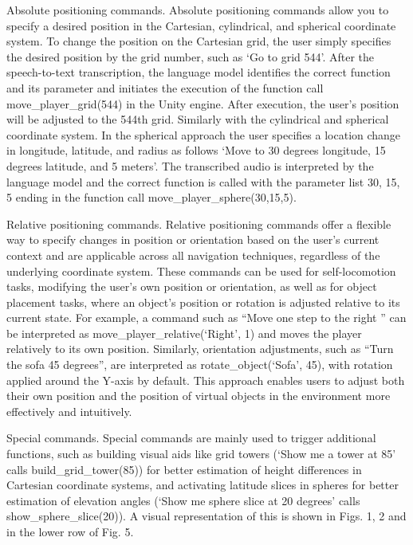 \documentclass[preprint,12pt]{elsarticle}
\newcommand{\reftext}[1]{{\color{gray}#1}}   %
\begin{document}
\reftext{Absolute positioning commands. Absolute positioning commands allow you to specify a desired position in the Cartesian, cylindrical, and spherical coordinate system. To change the position on the Cartesian grid, the user simply specifies the desired position by the grid number, such as `Go to grid 544'. After the speech-to-text transcription, the language model identifies the correct function and its parameter and initiates the execution of the function call move\_player\_grid(544) in the Unity engine. After execution, the user's position will be adjusted to the 544th grid. Similarly with the cylindrical and spherical coordinate system. In the spherical approach the user specifies a location change in longitude, latitude, and radius as follows `Move to 30 degrees longitude, 15 degrees latitude, and 5 meters'. The transcribed audio is interpreted by the language model and the correct function is called with the parameter list 30, 15, 5 ending in the function call move\_player\_sphere(30,15,5).}

\reftext{Relative positioning commands. Relative positioning commands offer a flexible way to specify changes in position or orientation based on the user's current context and are applicable across all navigation techniques, regardless of the underlying coordinate system. These commands can be used for self-locomotion tasks, modifying the user's own position or orientation, as well as for object placement tasks, where an object's position or rotation is adjusted relative to its current state. For example, a command such as ``Move one step to the right '' can be interpreted as move\_player\_relative(`Right', 1) and moves the player relatively to its own position. Similarly, orientation adjustments, such as ``Turn the sofa 45 degrees'', are interpreted as rotate\_object(`Sofa', 45), with rotation applied around the Y-axis by default. This approach enables users to adjust both their own position and the position of virtual objects in the environment more effectively and intuitively.}

\reftext{Special commands. Special commands are mainly used to trigger additional functions, such as building visual aids like grid towers (`Show me a tower at 85' calls build\_grid\_tower(85)) for better estimation of height differences in Cartesian coordinate systems, and activating latitude slices in spheres for better estimation of elevation angles (`Show me sphere slice at 20 degrees' calls show\_sphere\_slice(20)). A visual representation of this is shown in Figs. 1, 2 and in the lower row of Fig. 5.}
\end{document}

